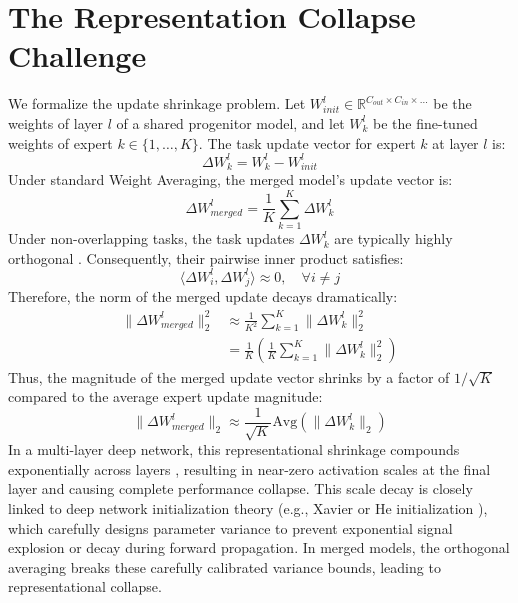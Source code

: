 \documentclass{article}
\theoremstyle{plain}
\theoremstyle{definition}
\theoremstyle{remark}
\begin{document}
\section{The Representation Collapse Challenge}
\label{submission3:sec:challenge}

We formalize the update shrinkage problem.
Let $W_{init}^l \in \mathbb{R}^{C_{out} \times C_{in} \times \dots}$ be the weights of layer $l$ of a shared progenitor model, and let $W_k^l$ be the fine-tuned weights of expert $k \in \{1, \dots, K\}$.
The task update vector for expert $k$ at layer $l$ is:
\begin{equation}
    \Delta W_k^l = W_k^l - W_{init}^l
\end{equation}
Under standard Weight Averaging, the merged model's update vector is:
\begin{equation}
    \Delta W_{merged}^l = \frac{1}{K} \sum_{k=1}^K \Delta W_k^l
\end{equation}
Under non-overlapping tasks, the task updates $\Delta W_k^l$ are typically highly orthogonal \cite{orthogonal_collapse, submission9_reference}. Consequently, their pairwise inner product satisfies:
\begin{equation}
    \langle \Delta W_i^l, \Delta W_j^l \rangle \approx 0, \quad \forall i \neq j
\end{equation}
Therefore, the norm of the merged update decays dramatically:
\begin{equation}
\begin{split}
    \|\Delta W_{merged}^l\|_2^2 &\approx \frac{1}{K^2} \sum_{k=1}^K \|\Delta W_k^l\|_2^2 \\
    &= \frac{1}{K} \left( \frac{1}{K} \sum_{k=1}^K \|\Delta W_k^l\|_2^2 \right)
\end{split}
\end{equation}
Thus, the magnitude of the merged update vector shrinks by a factor of $1/\sqrt{K}$ compared to the average expert update magnitude:
\begin{equation}
    \|\Delta W_{merged}^l\|_2 \approx \frac{1}{\sqrt{K}} \text{Avg}(\|\Delta W_k^l\|_2)
\end{equation}
In a multi-layer deep network, this representational shrinkage compounds exponentially across layers \cite{submission9_reference}, resulting in near-zero activation scales at the final layer and causing complete performance collapse.
This scale decay is closely linked to deep network initialization theory (e.g., Xavier or He initialization \cite{glorot2010understanding, he2015delving}), which carefully designs parameter variance to prevent exponential signal explosion or decay during forward propagation. In merged models, the orthogonal averaging breaks these carefully calibrated variance bounds, leading to representational collapse.
\end{document}
